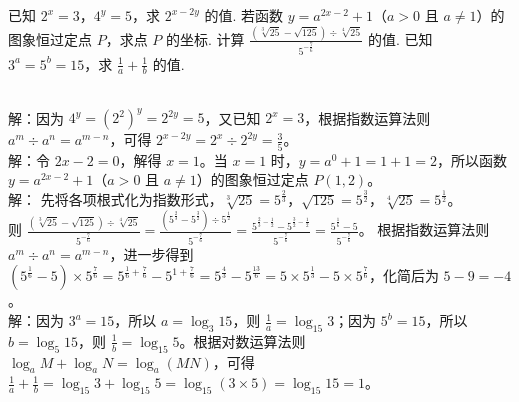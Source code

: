\documentclass{ctexart}
\newenvironment{MyAnswer}[1][] %
 {\begin{tcolorbox}[breakable, colframe=blue] \begin{Answer}[#1] \color{blue} \kaishu}  %
 {\end{Answer}\end{tcolorbox}}
\begin{document}

 \clearpage
\begin{Exercise}[title={指数运算小练习}, label={ex:exponent}]
    \Question 已知 $2^x = 3$，$4^y = 5$，求 $2^{x - 2y}$ 的值.
    \Question 若函数 $y = a^{2x - 2}+1$（$a>0$ 且 $a\neq1$）的图象恒过定点 $P$，求点 $P$ 的坐标.
    \Question 计算 $\frac{(\sqrt[3]{25}-\sqrt{125})\div\sqrt[4]{25}}{5^{-\frac{7}{6}}}$ 的值.
    \Question 已知 $3^a = 5^b = 15$，求 $\frac{1}{a}+\frac{1}{b}$ 的值.
\end{Exercise}

\begin{MyAnswer}[ref={ex:exponent}]
    \Question {}\\ 解：因为 $4^y=(2^2)^y = 2^{2y}=5$，又已知 $2^x = 3$，根据指数运算法则 $a^m\div a^n=a^{m - n}$，可得 $2^{x - 2y}=2^x\div2^{2y}=\frac{3}{5}$。
    \Question {}\\ 解：令 $2x - 2 = 0$，解得 $x = 1$。当 $x = 1$ 时，$y=a^{0}+1=1 + 1=2$，所以函数 $y = a^{2x - 2}+1$（$a>0$ 且 $a\neq1$）的图象恒过定点 $P(1,2)$。
    \Question {}\\ 解：
        先将各项根式化为指数形式，$\sqrt[3]{25}=5^{\frac{2}{3}}$，$\sqrt{125}=5^{\frac{3}{2}}$，$\sqrt[4]{25}=5^{\frac{1}{2}}$。\\
        则 $\frac{(\sqrt[3]{25}-\sqrt{125})\div\sqrt[4]{25}}{5^{-\frac{7}{6}}}=\frac{(5^{\frac{2}{3}}-5^{\frac{3}{2}})\div5^{\frac{1}{2}}}{5^{-\frac{7}{6}}}=\frac{5^{\frac{2}{3}-\frac{1}{2}}-5^{\frac{3}{2}-\frac{1}{2}}}{5^{-\frac{7}{6}}}=\frac{5^{\frac{1}{6}}-5}{5^{-\frac{7}{6}}}$。
        根据指数运算法则 $a^m\div a^n=a^{m - n}$，进一步得到 $(5^{\frac{1}{6}}-5)\times5^{\frac{7}{6}}=5^{\frac{1}{6}+\frac{7}{6}}-5^{1+\frac{7}{6}}=5^{\frac{4}{3}}-5^{\frac{13}{6}}=5\times5^{\frac{1}{3}}-5\times5^{\frac{7}{6}}$，化简后为 $5 - 9=-4$。
    \Question {}\\ 解：因为 $3^a = 15$，所以 $a=\log_3{15}$，则 $\frac{1}{a}=\log_{15}3$；因为 $5^b = 15$，所以 $b=\log_5{15}$，则 $\frac{1}{b}=\log_{15}5$。根据对数运算法则 $\log_aM+\log_aN=\log_a(MN)$，可得 $\frac{1}{a}+\frac{1}{b}=\log_{15}3+\log_{15}5=\log_{15}(3\times5)=\log_{15}15 = 1$。
\end{MyAnswer}
\clearpage
\end{document}
